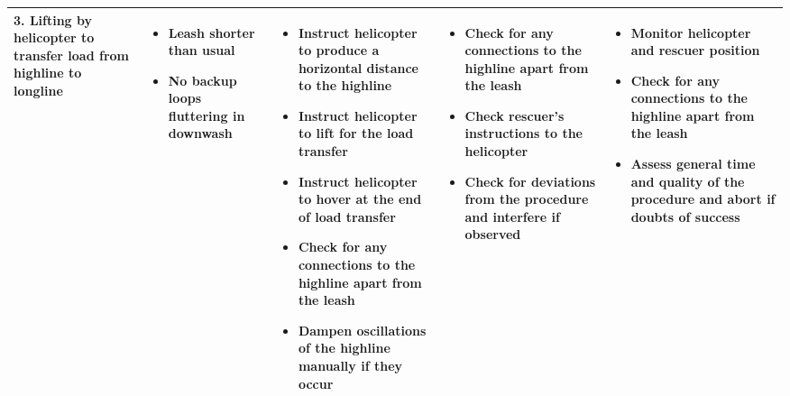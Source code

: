 \documentclass[a4paper,10pt]{scrartcl}
\begin{document}
\begin{landscape}
\begin{longtable}{|p{4cm}|p{4cm}|p{4cm}|p{4cm}|p{4cm}|}
 3. Lifting by helicopter to transfer load from highline to longline &
 \begin{itemize}
    \item Leash shorter than usual
    \item No backup loops fluttering in downwash
  \end{itemize} & 
   \begin{itemize}
    \item Instruct helicopter to produce a horizontal distance to the highline
    \item Instruct helicopter to lift for the load transfer
    \item Instruct helicopter to hover at the end of load transfer
    \item Check for any connections to the highline apart from the leash
    \item Dampen oscillations of the highline manually if they occur
  \end{itemize} & 
   \begin{itemize}
    \item Check for any connections to the highline apart from the leash
    \item Check rescuer's instructions to the helicopter
    \item Check for deviations from the procedure and interfere if observed
  \end{itemize} & 
   \begin{itemize}
    \item Monitor helicopter and rescuer position
    \item Check for any connections to the highline apart from the leash
    \item Assess general time and quality of the procedure and abort if doubts of success
  \end{itemize} \\
  \hline


\end{longtable}
\end{landscape}
\end{document}
